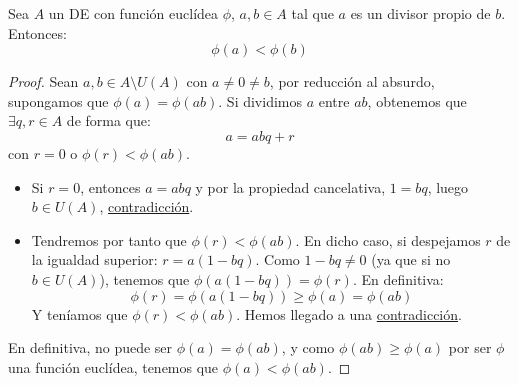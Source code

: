 \begin{lema}
    Sea $A$ un DE con función euclídea $\phi$, $a,b \in A$ tal que $a$ es un divisor propio de $b$. Entonces:
    $$\phi(a) < \phi(b)$$
\begin{proof}
    Sean $a,b\in A \setminus U(A)$ con $a \neq 0 \neq b$, por reducción al absurdo, supongamos que $\phi(a) = \phi(ab)$. Si dividimos $a$ entre $ab$, obtenemos que $\exists q,r\in A$ de forma que:
    \begin{equation*}
        a = abq + r
    \end{equation*}
    con $r = 0$ o $\phi(r) < \phi(ab)$.
    \begin{itemize}
        \item Si $r = 0$, entonces $a = abq$ y por la propiedad cancelativa, $1 = bq$, luego $b \in U(A)$, \underline{contradicción}.
        \item Tendremos por tanto que $\phi(r) < \phi(ab)$. En dicho caso, si despejamos $r$ de la igualdad superior: $r = a(1-bq)$. Como $1-bq\neq 0$ (ya que si no $b\in U(A)$), tenemos que $\phi(a(1-bq)) = \phi(r)$. En definitiva:
            \begin{equation*}
                \phi(r) = \phi(a(1-bq)) \geq \phi(a) = \phi(ab)
            \end{equation*}
            Y teníamos que $\phi(r) < \phi(ab)$. Hemos llegado a una \underline{contradicción}.
    \end{itemize}
    En definitiva, no puede ser $\phi(a) = \phi(ab)$, y como $\phi(ab) \geq \phi(a)$ por ser $\phi$ una función euclídea, tenemos que $\phi(a) < \phi(ab)$.
\end{proof}
\end{lema}

